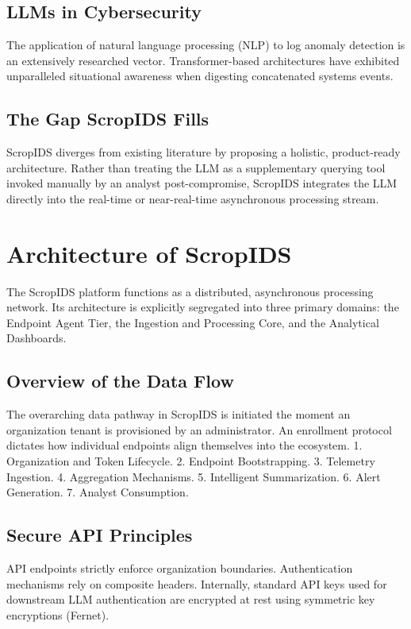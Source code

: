 \documentclass[10pt, conference]{IEEEtran}
\begin{document}
\subsection{LLMs in Cybersecurity}
The application of natural language processing (NLP) to log anomaly detection is an extensively researched vector. Transformer-based architectures have exhibited unparalleled situational awareness when digesting concatenated systems events.

\subsection{The Gap ScropIDS Fills}
ScropIDS diverges from existing literature by proposing a holistic, product-ready architecture. Rather than treating the LLM as a supplementary querying tool invoked manually by an analyst post-compromise, ScropIDS integrates the LLM directly into the real-time or near-real-time asynchronous processing stream.

\section{Architecture of ScropIDS}
The ScropIDS platform functions as a distributed, asynchronous processing network. Its architecture is explicitly segregated into three primary domains: the Endpoint Agent Tier, the Ingestion and Processing Core, and the Analytical Dashboards. 

\subsection{Overview of the Data Flow}
The overarching data pathway in ScropIDS is initiated the moment an organization tenant is provisioned by an administrator. An enrollment protocol dictates how individual endpoints align themselves into the ecosystem.
1. Organization and Token Lifecycle.
2. Endpoint Bootstrapping.
3. Telemetry Ingestion.
4. Aggregation Mechanisms.
5. Intelligent Summarization.
6. Alert Generation.
7. Analyst Consumption.

\subsection{Secure API Principles}
API endpoints strictly enforce organization boundaries. Authentication mechanisms rely on composite headers. Internally, standard API keys used for downstream LLM authentication are encrypted at rest using symmetric key encryptions (Fernet).
\end{document}
